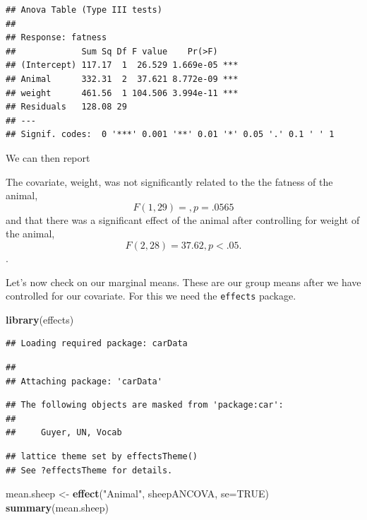 \documentclass[]{book}
\newenvironment{Shaded}{\begin{snugshade}}{\end{snugshade}}
\newcommand{\KeywordTok}[1]{\textcolor[rgb]{0.13,0.29,0.53}{\textbf{#1}}}
\newcommand{\DataTypeTok}[1]{\textcolor[rgb]{0.13,0.29,0.53}{#1}}
\newcommand{\StringTok}[1]{\textcolor[rgb]{0.31,0.60,0.02}{#1}}
\newcommand{\OtherTok}[1]{\textcolor[rgb]{0.56,0.35,0.01}{#1}}
\newcommand{\NormalTok}[1]{#1}
\theoremstyle{definition}
\theoremstyle{definition}
\theoremstyle{definition}
\theoremstyle{remark}
\begin{document}
\begin{verbatim}
## Anova Table (Type III tests)
## 
## Response: fatness
##             Sum Sq Df F value    Pr(>F)    
## (Intercept) 117.17  1  26.529 1.669e-05 ***
## Animal      332.31  2  37.621 8.772e-09 ***
## weight      461.56  1 104.506 3.994e-11 ***
## Residuals   128.08 29                      
## ---
## Signif. codes:  0 '***' 0.001 '**' 0.01 '*' 0.05 '.' 0.1 ' ' 1
\end{verbatim}

We can then report

The covariate, weight, was not significantly related to the the fatness
of the animal, \[F(1, 29) =,p=.0565 \] and that there was a significant
effect of the animal after controlling for weight of the animal,
\[F(2,28) = 37.62, p < .05.\].

Let's now check on our marginal means. These are our group means after
we have controlled for our covariate. For this we need the
\texttt{effects} package.

\begin{Shaded}
\begin{Highlighting}[]
\KeywordTok{library}\NormalTok{(effects)}
\end{Highlighting}
\end{Shaded}

\begin{verbatim}
## Loading required package: carData
\end{verbatim}

\begin{verbatim}
## 
## Attaching package: 'carData'
\end{verbatim}

\begin{verbatim}
## The following objects are masked from 'package:car':
## 
##     Guyer, UN, Vocab
\end{verbatim}

\begin{verbatim}
## lattice theme set by effectsTheme()
## See ?effectsTheme for details.
\end{verbatim}

\begin{Shaded}
\begin{Highlighting}[]
\NormalTok{mean.sheep <-}\StringTok{ }\KeywordTok{effect}\NormalTok{(}\StringTok{"Animal"}\NormalTok{, sheepANCOVA, }\DataTypeTok{se=}\OtherTok{TRUE}\NormalTok{)}
\KeywordTok{summary}\NormalTok{(mean.sheep)}
\end{Highlighting}
\end{Shaded}
\end{document}
